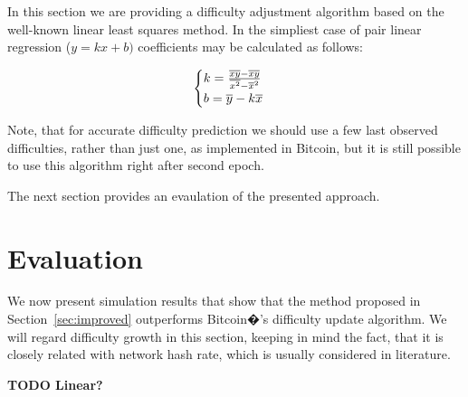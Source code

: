 \documentclass[]{llncs}
\begin{document}
In this section we are providing a  difficulty adjustment algorithm based on the well-known linear least squares method\cite{lawson1974solving}. In the simpliest case of pair linear regression (\(y=kx+b)\) coefficients may be calculated as follows:

\begin{equation}
  \begin{cases}
    k= {{\overline{xy} - \overline{x} \overline{y}} \over {\overline{x^2} - \overline{x}^2}}  \\
    b= \overline{y}-k\overline{x}
  \end{cases}
\end{equation}

Note, that for accurate difficulty prediction we should use a few last observed difficulties, rather than just one, as implemented in Bitcoin, but it is still possible to use this algorithm right after second epoch.



The next section provides an evaulation of the presented approach.

\section{Evaluation}
\label{sec:sim}

We now present simulation results that show that the  method proposed in Section~\ref{sec:improved} outperforms Bitcoin�'s difficulty update algorithm.
We will regard difficulty growth in this section, keeping in mind the fact, that it is closely related with network hash rate, which is usually considered in literature.

\textbf{TODO Linear?}
\end{document}
